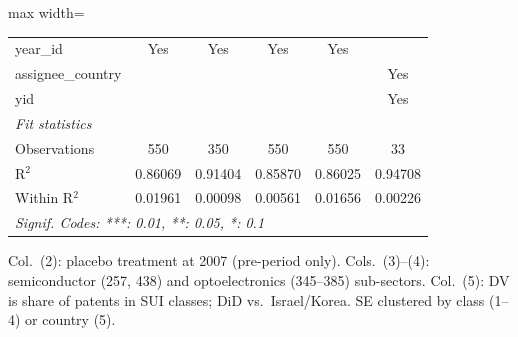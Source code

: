 \begin{table}[htbp]
\begin{adjustbox}{max width=\textwidth}
\begin{tabular}{lccccc}
      year\_id                                 & Yes          & Yes          & Yes            & Yes          & \\  
      assignee\_country                        &              &              &                &              & Yes\\  
      yid                                      &              &              &                &              & Yes\\  
      \midrule
      \emph{Fit statistics}\\
      Observations                             & 550          & 350          & 550            & 550          & 33\\  
      R$^2$                                    & 0.86069      & 0.91404      & 0.85870        & 0.86025      & 0.94708\\  
      Within R$^2$                             & 0.01961      & 0.00098      & 0.00561        & 0.01656      & 0.00226\\  
      \midrule \midrule
      \multicolumn{6}{l}{\emph{Signif. Codes: ***: 0.01, **: 0.05, *: 0.1}}\\
   \end{tabular}\end{adjustbox}
   
   \par \raggedright 
   Col.\ (2): placebo treatment at 2007 (pre-period only). Cols.\ (3)--(4): semiconductor (257, 438) and optoelectronics (345--385) sub-sectors. Col.\ (5): DV is share of patents in SUI classes; DiD vs.\ Israel/Korea. SE clustered by class (1--4) or country (5).
\end{table}


